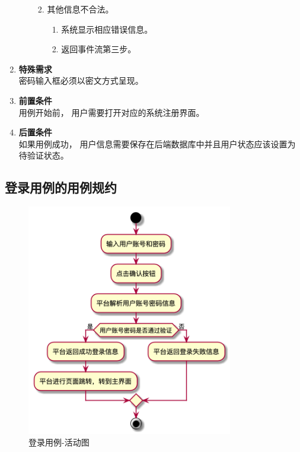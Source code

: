 \begin{enumerate}
\begin{enumerate}
\begin{enumerate}
\begin{enumerate}
            \end{enumerate}
            \item 其他信息不合法。
            \begin{enumerate}
                \item 系统显示相应错误信息。
                \item 返回事件流第三步。
            \end{enumerate}
        \end{enumerate}
    \end{enumerate}
    \item \textbf{特殊需求} \\ 密码输入框必须以密文方式呈现。
    \item \textbf{前置条件} \\ 用例开始前， 用户需要打开对应的系统注册界面。
    \item \textbf{后置条件} \\ 如果用例成功， 用户信息需要保存在后端数据库中并且用户状态应该设置为待验证状态。
\end{enumerate}

\subsection{登录用例的用例规约}

    \begin{figure}[htp]
        \centering
        \includegraphics[width=9cm]{report/figure/usecase_v2/uc_login.png}
        \caption{登录用例-活动图}
        \label{fig:logon-uml}
    \end{figure}
    

